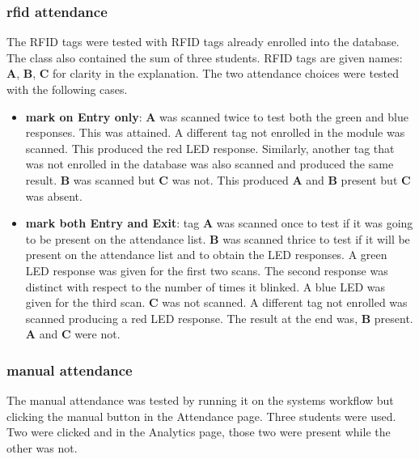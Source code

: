 \subsubsection*{rfid attendance}
The \gls{RFID} tags were tested with \gls{RFID} tags already enrolled into the database. The class also contained the sum of three students. \gls{RFID} tags are given names: \textbf{A}, \textbf{B}, \textbf{C} for clarity in the explanation. The two attendance choices were tested with the following cases.
\begin{itemize}
 \item \textbf{mark on Entry only}: \textbf{A} was scanned twice to test both the green and blue responses. This was attained. A different tag not enrolled in the module was scanned. This produced the red LED response. Similarly, another tag that was not enrolled in the database was also scanned and produced the same result. \textbf{B} was scanned but \textbf{C} was not. This produced \textbf{A} and \textbf{B} present but \textbf{C} was absent.
 \item \textbf{mark both Entry and Exit}: tag \textbf{A} was scanned once to test if it was going to be present on the attendance list. \textbf{B} was scanned thrice to test if it will be present on the attendance list and to obtain the LED responses. A green LED response was given for the first two scans. The second response was distinct with respect to the number of times it blinked. A blue LED was given for the third scan. \textbf{C} was not scanned. A different tag  not enrolled was scanned producing a red LED response. The result at the end was, \textbf{B} present. \textbf{A} and \textbf{C} were not.
\end{itemize}
 
\subsubsection*{manual attendance}
The manual attendance was tested by running it on the systems workflow but clicking the manual button in the Attendance page. Three students were used. Two were clicked and in the Analytics page, those two were present while the other was not.

 
